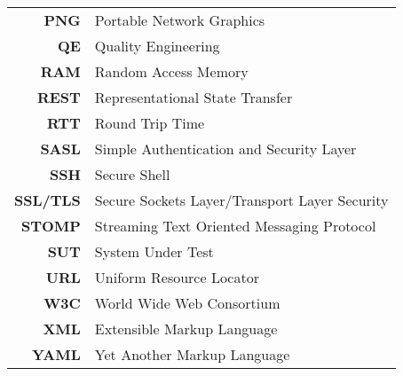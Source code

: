 \begin{longtable}{rl}
     \textbf{PNG} & Portable Network Graphics \\
     \textbf{QE} & Quality Engineering \\
     \textbf{RAM} & Random Access Memory \\
     \textbf{REST} & Representational State Transfer \\
     \textbf{RTT} & Round Trip Time \\
     \textbf{SASL} & Simple Authentication and Security Layer \\
     \textbf{SSH} & Secure Shell \\
     \textbf{SSL/TLS} & Secure Sockets Layer/Transport Layer Security \\
     \textbf{STOMP} & Streaming Text Oriented Messaging Protocol \\
     \textbf{SUT} & System Under Test \\
     \textbf{URL} & Uniform Resource Locator \\
     \textbf{W3C} & World Wide Web Consortium \\
     \textbf{XML} & Extensible Markup Language \\
     \textbf{YAML} & Yet Another Markup Language \\
  \end{longtable}
\endgroup
